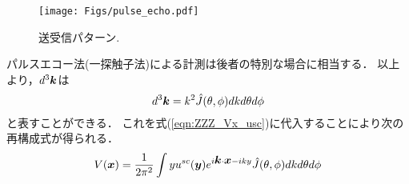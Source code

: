 \begin{figure}[h]
	\begin{center}
	\texttt{[image: Figs/pulse\_echo.pdf]} 
	\end{center}
	\caption{送受信パターン.} 
	\label{fig:ZZZ_101}
\end{figure}
パルスエコー法(一探触子法)による計測は後者の特別な場合に相当する．
以上より，$d^3\mbox{\boldmath $k$}$は
\begin{equation}
	d^3\mbox{\boldmath $k$}=k^2\hat{J}(\theta,\phi) dkd\theta d\phi
	\label{eqn:ZZZ_30}
\end{equation}
と表すことができる．
これを式(\ref{eqn:ZZZ_Vx_usc})に代入することにより次の再構成式が得られる．
\begin{equation}
	V(\mbox{\boldmath $x$}) =\frac{1}{2\pi^2} \int yu^{sc}(\mbox{\boldmath $y$})
	e^{i\mbox{\boldmath $k$}\cdot \mbox{\boldmath $x$}-iky}
	\hat{J}(\theta,\phi) dkd\theta d\phi
	\label{eqn:ZZZ_31}
\end{equation}


